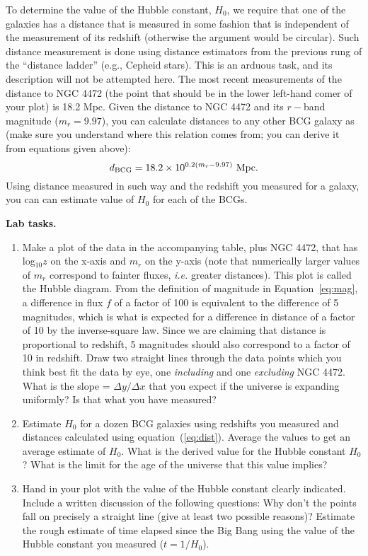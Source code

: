 \documentclass[12pt]{article}
\begin{document}
 To determine the value of the Hubble constant, $H_0$, we require that one
of the galaxies has a distance that is measured in some fashion that is
independent of the measurement of its redshift (otherwise the argument would be
circular). Such distance measurement is done using distance estimators
from the previous rung of the ``distance ladder'' (e.g., Cepheid stars). 
This is an arduous task, and its description will not be attempted
here. The most recent measurements of the distance to NGC 4472
(the point that should be in the lower left-hand comer of your plot) is 18.2 Mpc.
Given the distance to NGC 4472 and its $r-$band magnitude ($m_r=9.97$), 
you can calculate distances to any other BCG galaxy as (make sure you understand
where this relation comes from; you can derive it from equations given above): 
\begin{equation}
d_{\rm BCG}=18.2\times 10^{0.2(m_r-9.97)}{\ \rm Mpc}. 
\label{eq:dist}
\end{equation}
Using distance measured in such way and the redshift you measured 
for a galaxy, you can can estimate value of $H_0$ for each of the BCGs. 

{\bf Lab tasks.}
{\it 
\begin{enumerate}
\item Make a plot of the data in the accompanying table, plus NGC 4472, that has
log$_{10}z$ on the x-axis and $m_r$ on the y-axis (note that numerically
larger values of $m_r$ correspond to fainter fluxes, {\it i.e.} greater
distances). This plot is called the Hubble diagram. 
From the definition of magnitude in Equation~\ref{eq:mag}, a
difference in flux $f$ of a factor of 100 is equivalent to the difference of 5 magnitudes,
which is what is expected for a difference in
distance of a factor of 10 by the inverse-square law. Since we are claiming that distance is proportional
to redshift, 5 magnitudes should also correspond to a factor of 10 in redshift.
Draw two straight lines through the data points which you think best fit the data 
by eye, one {\em
including} and one {\em excluding} NGC 4472. What is the slope = $\Delta
y/\Delta x$ that you expect if the universe is expanding uniformly? Is that what
you have measured? \label{item:first}

\item Estimate $H_0$ for a dozen BCG galaxies using redshifts you measured and
distances calculated using equation~(\ref{eq:dist}). Average the values to get 
an average estimate of $H_0$. 
What is the derived value for the Hubble constant $H_0$? What is the limit for
the age of the universe that this value implies?

\item Hand in your plot with the value of the Hubble constant clearly indicated.
Include a written discussion of the following questions: Why don't the points
fall on precisely a straight line (give at least two possible reasons)? 
Estimate the rough estimate of time elapsed since the Big Bang using the
value of the Hubble constant you measured ($t=1/H_0$). 
\end{enumerate}
}
\end{document}
